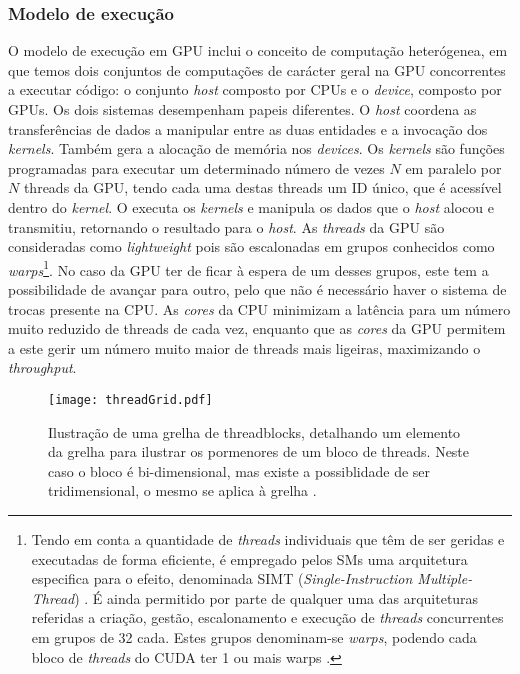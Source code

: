 \subsubsection{Modelo de execução}
\label{exec}
O modelo de execução em GPU inclui o conceito de computação heterógenea, em que temos dois conjuntos de computações de carácter geral na GPU concorrentes a executar código: o conjunto \textit{host} composto por CPUs e o \textit{device}, composto por GPUs. Os dois sistemas desempenham papeis diferentes. O \textit{host} coordena as transferências de dados a manipular entre as duas entidades e a invocação dos \textit{kernels}. Também gera a alocação de memória nos \textit{devices}.
Os \textit{kernels} são funções programadas para executar um determinado número de vezes $N$ em paralelo por $N$ threads da GPU, tendo cada uma destas threads um ID único, que é acessível dentro do \textit{kernel}. O  executa os \textit{kernels} e manipula os dados que o \textit{host} alocou e transmitiu, retornando o resultado para o \textit{host}.
 As  \textit{threads} da GPU são consideradas como \textit{lightweight} pois são escalonadas em grupos conhecidos como \textit{warps}\cite{cudaProgGuide}\footnote[1] {Tendo em conta a quantidade de  \textit{threads} individuais que têm de ser geridas e executadas de forma eficiente, é empregado pelos SMs uma arquitetura especifica para o efeito, denominada SIMT (\textit{Single-Instruction Multiple-Thread}) \cite{nvidiaTesla}.
É ainda permitido por parte de qualquer uma das arquiteturas referidas a criação, gestão, escalonamento e execução de  \textit{threads} concurrentes em grupos de 32 cada. Estes grupos denominam-se \textit{warps}, podendo cada bloco de  \textit{threads} do CUDA ter 1 ou mais warps
\cite{nickolls2010gpu}.}. No caso da GPU ter de ficar à espera de um desses grupos, este tem a possibilidade de avançar para outro, pelo que não é necessário haver o sistema de trocas presente na CPU. As \textit{cores} da CPU minimizam a latência para um número muito reduzido de threads de cada vez, enquanto que as \textit{cores} da GPU permitem a este gerir um número muito maior de threads mais ligeiras, maximizando o \textit{throughput}.
  \begin{figure}[ht]
  \centering
    {\texttt{[image: threadGrid.pdf]}}
  \caption{Ilustração de uma grelha de threadblocks, detalhando um elemento da grelha para ilustrar os pormenores de um bloco de threads. Neste caso o bloco é bi-dimensional, mas existe a possiblidade de ser tridimensional, o mesmo se aplica à grelha \cite{cpg}.}
  \label{threadGrid}
\end{figure}
